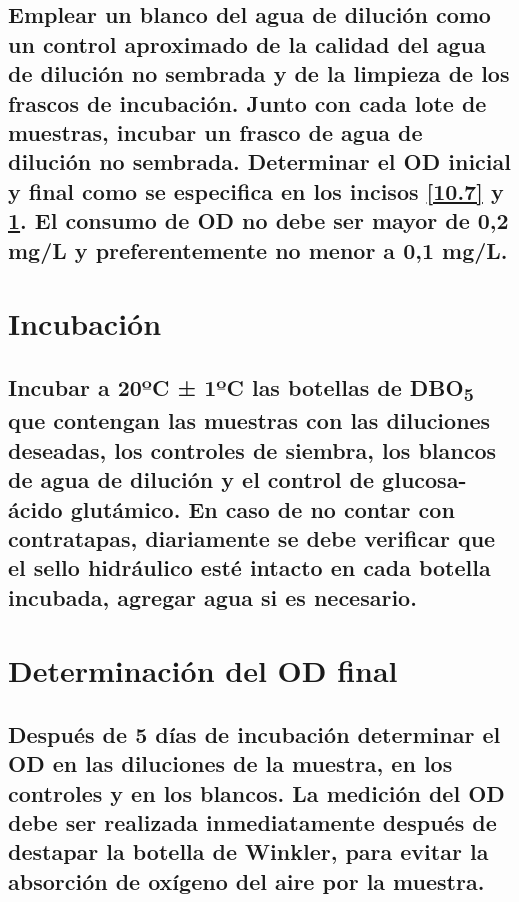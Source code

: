 \documentclass[spanish,12pt,letterpaper,titlepage]{article}
\theoremstyle{definition}
\begin{document}
	\subsection{Emplear un blanco del agua de dilución como un control aproximado de la calidad del agua de dilución no sembrada y de la limpieza de los frascos de incubación. Junto con cada lote de muestras, incubar un frasco de agua de dilución no sembrada. Determinar el OD inicial y final como se especifica en los incisos \ref{10.7} y \ref{10.10}. El consumo de OD no debe ser mayor de 0,2 mg/L y preferentemente no menor a 0,1 mg/L.}\label{10.9.1}
	\section{Incubación}\label{10.10}
	\subsection{Incubar a 20ºC ± 1ºC las botellas de DBO\textsubscript{5} que contengan las muestras con las diluciones deseadas, los controles de siembra, los blancos de agua de dilución y el control de glucosa-ácido glutámico. En caso de no contar con contratapas, diariamente se debe verificar que el sello hidráulico esté intacto en cada botella incubada, agregar agua si es necesario.}\label{10.10.1}
	\section{Determinación del OD final}\label{10.11}
	\subsection{Después de 5 días de incubación determinar el OD en las diluciones de la muestra, en los controles y en los blancos. La medición del OD debe ser realizada inmediatamente después de destapar la botella de Winkler, para evitar la absorción de oxígeno del aire por la muestra.}\label{10.11.1}
\end{document}
